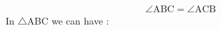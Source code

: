\documentclass[journal,12pt,twocolumn]{IEEEtran}
\begin{document}
\begin{align}
\angle \text{ABC} = \angle \text{ACB} 
 \end{align}
  In $\triangle$ABC we can have :
%
% 
%  
% 
% 
% 
% 
% 
%  
%  
%  
  
\end{document}
